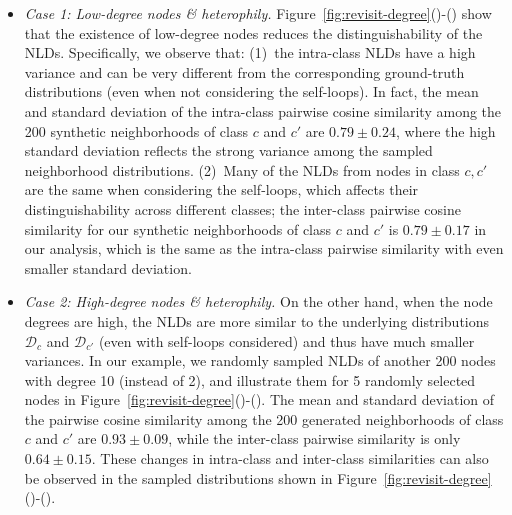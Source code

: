 \begin{itemize}
\item \textit{Case 1: Low-degree nodes \& heterophily.} 
Figure~\ref{fig:revisit-degree}()-() show that the existence of low-degree nodes reduces the distinguishability of the NLDs. Specifically, we observe that:
(1)~the intra-class NLDs have a high variance and can be very different from the corresponding ground-truth distributions (even when not considering the self-loops). In fact, the mean and standard deviation of the intra-class pairwise cosine similarity among the 200 synthetic neighborhoods of class $c$ and $c'$ are $0.79\pm 0.24$, where the high standard deviation reflects the strong variance among the sampled neighborhood distributions. (2)~Many of the NLDs from nodes in class $c, c'$ are the same when considering the self-loops, which affects their distinguishability across different classes; the inter-class pairwise cosine similarity for our synthetic neighborhoods of class $c$ and $c'$ is $0.79\pm0.17$ in our analysis, which is the same as the intra-class pairwise similarity with even smaller standard deviation.



\item \textit{Case 2: High-degree nodes \& heterophily.} 
On the other hand, when the node degrees are high, the NLDs are more similar to the underlying distributions $\mathcal{D}_c$ and $\mathcal{D}_{c'}$ (even with self-loops considered) and thus have much smaller variances. In our example, we randomly sampled NLDs of another 200 nodes with degree 10 (instead of 2), and illustrate them for 5 randomly selected nodes in Figure~\ref{fig:revisit-degree}()-(). The mean and standard deviation of the pairwise cosine similarity among the 200 generated neighborhoods of class $c$ and $c'$ are $0.93\pm0.09$, while the inter-class pairwise similarity is only $0.64\pm0.15$. These changes in intra-class and inter-class similarities can also be observed in the sampled distributions shown in Figure~\ref{fig:revisit-degree}()-().





\end{itemize}
